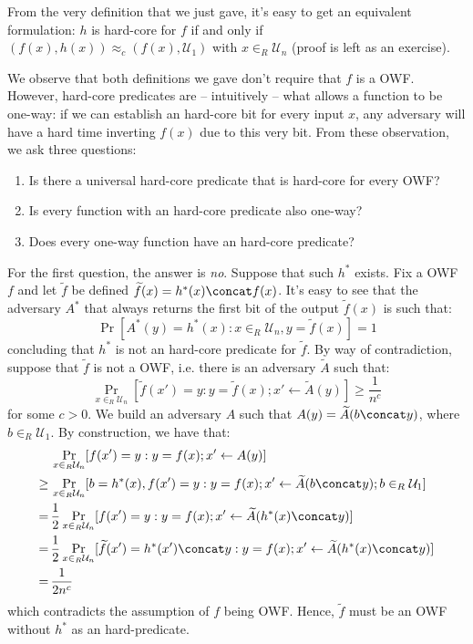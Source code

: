 \documentclass[a4paper, 12pt]{report}
\begin{document}
    From the very definition that we just gave, it's easy to get an equivalent formulation: $h$ is hard-core for $f$ if and only if $(f(x), h(x)) \approx_c (f(x), \mathcal{U}_1)$ with $x \in_R \mathcal{U}_n$ (proof is left as an exercise).
    
    We observe that both definitions we gave don't require that $f$ is a OWF. However, hard-core predicates are -- intuitively -- what allows a function to be one-way: if we can establish an hard-core bit for every input $x$, any adversary will have a hard time inverting $f(x)$ due to this very bit. From these observation, we ask three questions:
    \begin{enumerate}
        \item Is there a universal hard-core predicate that is hard-core for every OWF?
        \item Is every function with an hard-core predicate also one-way?
        \item Does every one-way function have an hard-core predicate?
    \end{enumerate}

    For the first question, the answer is \textit{no}. Suppose that such $h^*$ exists. Fix a OWF $f$ and let $\widetilde f$ be defined $\widetilde f(x) = h^*(x) \concat f(x)$. It's easy to see that the adversary $A^*$ that always returns the first bit of the output $\widetilde f(x)$ is such that:
    \[\Pr[A^*(y) = h^*(x) : x \in_R \mathcal{U}_n, y = \widetilde f(x)] = 1\]
    concluding that $h^*$ is not an hard-core predicate for $\widetilde f$. By way of contradiction, suppose that $\widetilde f$ is not a OWF, i.e. there is an adversary $\widetilde A$ such that:
    \[\Pr_{x \in_R \mathcal{U}_n}[\widetilde f(x') = y : y = \widetilde f(x); x' \gets \widetilde A(y)] \geq \frac{1}{n^c}\]
    for some $c > 0$. We build an adversary $A$ such that $A(y) = \widetilde A(b \concat y)$, where $b \in_R \mathcal{U}_1$. By construction, we have that:
    \[\begin{split}
        &\Pr_{x \in_R \mathcal{U}_n}[f(x') = y : y = f(x); x' \gets A(y)]\\
        \geq\,& \Pr_{x \in_R \mathcal{U}_n}[b = h^*(x), f(x') = y : y = f(x); x' \gets \widetilde A(b \concat y); b \in_R \mathcal{U}_1] \\
        =\,& \frac{1}{2}\Pr_{x \in_R \mathcal{U}_n}[f(x') = y : y = f(x); x' \gets \widetilde A(h^*(x) \concat y)] \\
        =\,& \frac{1}{2}\Pr_{x \in_R \mathcal{U}_n}[\widetilde f(x') = h^*(x') \concat y : y = f(x); x' \gets \widetilde A(h^*(x) \concat y)] \\
        =\,& \frac{1}{2n^c}
    \end{split}\]
    which contradicts the assumption of $f$ being OWF. Hence, $\widetilde f$ must be an OWF without $h^*$ as an hard-predicate.
\end{document}
